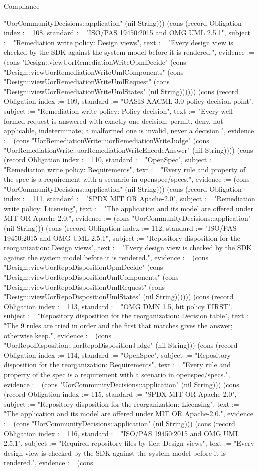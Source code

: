 \begin{lexlean}{Compliance}
\begin{semanticmodule}
{"UorCommunityDecisions::application" (nil String))}) (cons (record Obligation {index := 108, standard := "ISO/PAS 19450:2015 and OMG UML 2.5.1", subject := "Remediation write policy: Design views", text := "Every design view is checked by the SDK against the system model before it is rendered.", evidence := (cons "Design::viewUorRemediationWriteOpmDecide" (cons "Design::viewUorRemediationWriteUmlComponents" (cons "Design::viewUorRemediationWriteUmlRequest" (cons "Design::viewUorRemediationWriteUmlStates" (nil String)))))}) (cons (record Obligation {index := 109, standard := "OASIS XACML 3.0 policy decision point", subject := "Remediation write policy: Policy decision", text := "Every well-formed request is answered with exactly one decision: permit, deny, not-applicable, indeterminate; a malformed one is invalid, never a decision.", evidence := (cons "UorRemediationWrite::uorRemediationWriteJudge" (cons "UorRemediationWrite::uorRemediationWriteEncodeAnswer" (nil String)))}) (cons (record Obligation {index := 110, standard := "OpenSpec", subject := "Remediation write policy: Requirements", text := "Every rule and property of the spec is a requirement with a scenario in openspec/specs.", evidence := (cons "UorCommunityDecisions::application" (nil String))}) (cons (record Obligation {index := 111, standard := "SPDX MIT OR Apache-2.0", subject := "Remediation write policy: Licensing", text := "The application and its model are offered under MIT OR Apache-2.0.", evidence := (cons "UorCommunityDecisions::application" (nil String))}) (cons (record Obligation {index := 112, standard := "ISO/PAS 19450:2015 and OMG UML 2.5.1", subject := "Repository disposition for the reorganization: Design views", text := "Every design view is checked by the SDK against the system model before it is rendered.", evidence := (cons "Design::viewUorRepoDispositionOpmDecide" (cons "Design::viewUorRepoDispositionUmlComponents" (cons "Design::viewUorRepoDispositionUmlRequest" (cons "Design::viewUorRepoDispositionUmlStates" (nil String)))))}) (cons (record Obligation {index := 113, standard := "OMG DMN 1.5, hit policy FIRST", subject := "Repository disposition for the reorganization: Decision table", text := "The 9 rules are tried in order and the first that matches gives the answer; otherwise keep.", evidence := (cons "UorRepoDisposition::uorRepoDispositionJudge" (nil String))}) (cons (record Obligation {index := 114, standard := "OpenSpec", subject := "Repository disposition for the reorganization: Requirements", text := "Every rule and property of the spec is a requirement with a scenario in openspec/specs.", evidence := (cons "UorCommunityDecisions::application" (nil String))}) (cons (record Obligation {index := 115, standard := "SPDX MIT OR Apache-2.0", subject := "Repository disposition for the reorganization: Licensing", text := "The application and its model are offered under MIT OR Apache-2.0.", evidence := (cons "UorCommunityDecisions::application" (nil String))}) (cons (record Obligation {index := 116, standard := "ISO/PAS 19450:2015 and OMG UML 2.5.1", subject := "Required repository files by tier: Design views", text := "Every design view is checked by the SDK against the system model before it is rendered.", evidence := (cons }
\end{semanticmodule}
\end{lexlean}
